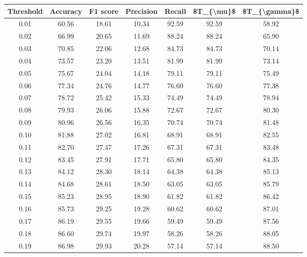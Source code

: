 \begin{tabular}{|c|c|c|c|c|c|c|}
\hline
 Threshold &  Accuracy &  F1 score &  Precision &  Recall &  \$T\_\{\textbackslash mu\}\$ &  \$T\_\{\textbackslash gamma\}\$ \\
\hline
      0.01 &     60.56 &     18.61 &      10.34 &   92.59 &      92.59 &         58.92 \\
      0.02 &     66.99 &     20.65 &      11.69 &   88.24 &      88.24 &         65.90 \\
      0.03 &     70.85 &     22.06 &      12.68 &   84.73 &      84.73 &         70.14 \\
      0.04 &     73.57 &     23.20 &      13.51 &   81.99 &      81.99 &         73.14 \\
      0.05 &     75.67 &     24.04 &      14.18 &   79.11 &      79.11 &         75.49 \\
      0.06 &     77.34 &     24.76 &      14.77 &   76.60 &      76.60 &         77.38 \\
      0.07 &     78.72 &     25.42 &      15.33 &   74.49 &      74.49 &         78.94 \\
      0.08 &     79.93 &     26.06 &      15.88 &   72.67 &      72.67 &         80.30 \\
      0.09 &     80.96 &     26.56 &      16.35 &   70.74 &      70.74 &         81.48 \\
      0.10 &     81.88 &     27.02 &      16.81 &   68.91 &      68.91 &         82.55 \\
      0.11 &     82.70 &     27.47 &      17.26 &   67.31 &      67.31 &         83.48 \\
      0.12 &     83.45 &     27.91 &      17.71 &   65.80 &      65.80 &         84.35 \\
      0.13 &     84.12 &     28.30 &      18.14 &   64.38 &      64.38 &         85.13 \\
      0.14 &     84.68 &     28.61 &      18.50 &   63.05 &      63.05 &         85.79 \\
      0.15 &     85.23 &     28.95 &      18.90 &   61.82 &      61.82 &         86.42 \\
      0.16 &     85.73 &     29.25 &      19.28 &   60.62 &      60.62 &         87.01 \\
      0.17 &     86.19 &     29.55 &      19.66 &   59.49 &      59.49 &         87.56 \\
      0.18 &     86.60 &     29.74 &      19.97 &   58.26 &      58.26 &         88.05 \\
      0.19 &     86.98 &     29.93 &      20.28 &   57.14 &      57.14 &         88.50 \\

\end{tabular}
